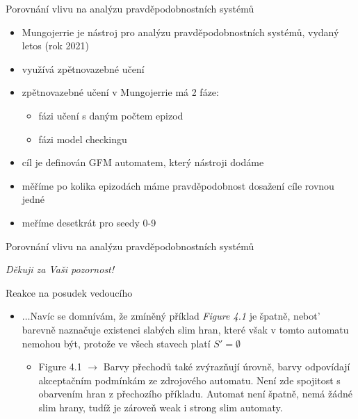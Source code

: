 \documentclass[
]{beamer}
\begin{document}
	
\begin{frame}{Porovnání vlivu na analýzu pravděpodobnostních systémů}
	\begin{itemize}
		\pause
		\item \alert{Mungojerrie} je nástroj pro analýzu pravděpodobnostních systémů, vydaný letos (rok 2021)\pause
		\item využívá zpětnovazebné učení\pause
		\item zpětnovazebné učení v Mungojerrie má 2 fáze:\pause
		\begin{itemize}
			\item fázi učení s daným počtem epizod
			\item fázi model checkingu
		\end{itemize}\pause
		\item \alert{cíl je definován GFM automatem}, který nástroji dodáme\pause
		\item měříme po kolika epizodách máme pravděpodobnost dosažení cíle rovnou jedné\pause
		\item meříme desetkrát pro seedy 0-9\pause
	\end{itemize}
		
\end{frame}
\begin{frame}{Porovnání vlivu na analýzu pravděpodobnostních systémů}
	
	\pause
	\begin{flushright}\emph{Děkuji za Vaši pozornost!}\end{flushright}

\end{frame}



\appendix




	\begin{frame}{Reakce na posudek vedoucího}
		\begin{itemize}
		\item $\ldots$Navíc se domnívám, že zmíněný příklad \emph{Figure 4.1} je špatně, nebot’ barevně naznačuje existenci slabých slim hran, které však v tomto automatu nemohou být, protože ve všech stavech platí $S'= \emptyset$
		\begin{itemize}
		\item Figure 4.1 $\rightarrow$
		Barvy přechodů také zvýrazňují úrovně, barvy odpovídají akceptačním podmínkám ze zdrojového automatu. Není zde spojitost s obarvením hran z přechozího příkladu. Automat není špatně, nemá žádné slim hrany, tudíž je zároveň weak i strong slim automaty.
		\end{itemize}
	\end{itemize}

		
		
	\end{frame}
	
\end{document}
